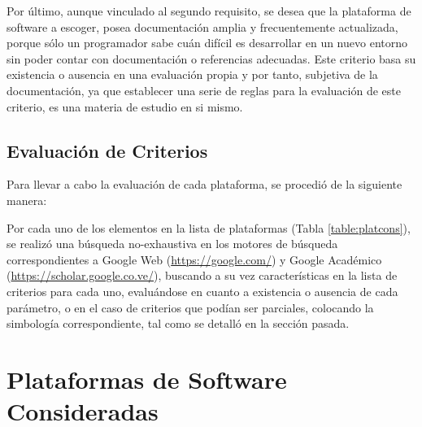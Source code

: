 Por último, aunque vinculado al segundo requisito, se desea que la plataforma de software a escoger, posea documentación amplia y frecuentemente actualizada, porque sólo un programador sabe cuán difícil es desarrollar en un nuevo entorno sin poder contar con documentación o referencias adecuadas. Este criterio basa su existencia o ausencia en una evaluación propia y por tanto, subjetiva de la documentación, ya que establecer una serie de reglas para la evaluación de este criterio, es una materia de estudio en si mismo.

\subsection{Evaluación de Criterios}

Para llevar a cabo la evaluación de cada plataforma, se procedió de la siguiente manera:

Por cada uno de los elementos en la lista de plataformas (Tabla \ref{table:platcons}), se realizó una búsqueda no-exhaustiva en los motores de búsqueda correspondientes a Google Web (\url{https://google.com/}) y Google Académico (\url{https://scholar.google.co.ve/}), buscando a su vez características en la lista de criterios para cada uno, evaluándose en cuanto a existencia o ausencia de cada parámetro, o en el caso de criterios que podían ser parciales, colocando la simbología correspondiente, tal como se detalló en la sección pasada.

\section{Plataformas de Software Consideradas}

